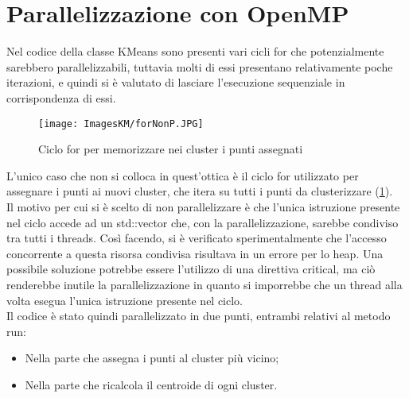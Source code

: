 \documentclass[10pt,twocolumn,letterpaper]{article}
\newcommand{\bit} {\begin{itemize} }
\newcommand{\eit} {\end{itemize} }
\begin{document}
\section{Parallelizzazione con OpenMP}
\label{sec:par}
Nel codice della classe KMeans sono presenti vari cicli for che potenzialmente sarebbero parallelizzabili, tuttavia molti di essi presentano relativamente poche iterazioni, e quindi si è valutato di lasciare l'esecuzione sequenziale in corrispondenza di essi.\\
\begin{figure}[h]
    \centering
    \texttt{[image: ImagesKM/forNonP.JPG]}
    \caption{Ciclo for per memorizzare nei cluster i punti assegnati}
    \label{fig:forNP}
\end{figure}
L'unico caso che non si colloca in quest'ottica è il ciclo for utilizzato per assegnare i punti ai nuovi cluster, che itera su tutti i punti da clusterizzare (\cref{fig:forNP}).\\
Il motivo per cui si è scelto di non parallelizzare è che l'unica istruzione presente nel ciclo accede ad un std::vector che, con la parallelizzazione, sarebbe condiviso tra tutti i threads. Così facendo, si è verificato sperimentalmente che l'accesso concorrente a questa risorsa condivisa risultava in un errore per lo heap. Una possibile soluzione potrebbe essere l'utilizzo di una direttiva critical, ma ciò renderebbe inutile la parallelizzazione in quanto si imporrebbe che un thread alla volta esegua l'unica istruzione presente nel ciclo.\\
Il codice è stato quindi parallelizzato in due punti, entrambi relativi al metodo run:
\bit
    \item{Nella parte che assegna i punti al cluster più vicino;}
    \item{Nella parte che ricalcola il centroide di ogni cluster.}
\eit
\end{document}
